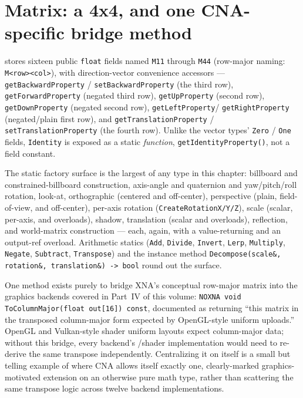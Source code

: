 \section{Matrix: a 4x4, and one CNA-specific bridge method}

 stores sixteen public \texttt{float} fields named \texttt{M11}
through \texttt{M44} (row-major naming: \texttt{M<row><col>}), with direction-vector
convenience accessors --- \texttt{getBackwardProperty} / \texttt{setBackwardProperty} (the
third row), \texttt{getForwardProperty} (negated third row), \texttt{getUpProperty} (second
row), \texttt{getDownProperty} (negated second row), \texttt{getLeftProperty}/%
\texttt{getRightProperty} (negated/plain first row), and
\texttt{getTranslationProperty} / \texttt{setTranslationProperty} (the fourth row). Unlike the
vector types' \texttt{Zero} / \texttt{One} fields, \texttt{Identity} is exposed as a static
\emph{function}, \texttt{getIdentityProperty()}, not a field constant.

The static factory surface is the largest of any type in this chapter: billboard and
constrained-billboard construction, axis-angle and quaternion and yaw/pitch/roll rotation,
look-at, orthographic (centered and off-center), perspective (plain, field-of-view, and
off-center), per-axis rotation (\texttt{CreateRotationX/Y/Z}), scale (scalar, per-axis, and
 overloads), shadow, translation (scalar and 
overloads), reflection, and world-matrix construction --- each, again, with a value-returning
and an output-ref overload. Arithmetic statics (\texttt{Add}, \texttt{Divide},
\texttt{Invert}, \texttt{Lerp}, \texttt{Multiply}, \texttt{Negate}, \texttt{Subtract},
\texttt{Transpose}) and the instance method \texttt{Decompose(scale\&, rotation\&,
translation\&) -> bool} round out the surface.

One method exists purely to bridge XNA's conceptual row-major matrix into the graphics
backends covered in Part~IV of this volume: \texttt{NOXNA void ToColumnMajor(float
out[16]) const}, documented as returning ``this matrix in the transposed column-major form
expected by OpenGL-style uniform uploads.'' OpenGL and Vulkan-style shader uniform layouts
expect column-major data; without this bridge, every backend's /shader
implementation would need to re-derive the same transpose independently. Centralizing it on
 itself is a small but telling example of where CNA allows itself exactly
one, clearly-marked graphics-motivated extension on an otherwise pure math type, rather than
scattering the same transpose logic across twelve backend implementations.

